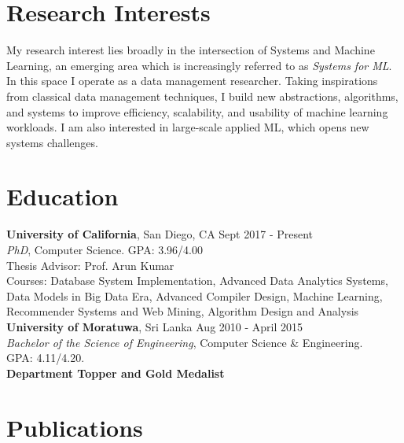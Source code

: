 \documentclass[margin]{res}
\begin{document}

\address{Phone: (+1) 812-558-6888\\ Email: snakanda@eng.ucsd.edu\\ Web: \href{https://scnakandala.github.io}{scnakandala.github.io}}
\address{3232 EBU3B CSE\\9500 Gilman Drive\\La Jolla, CA 92093}


\begin{resume}
\vspace{-2mm}
\section{Research Interests}
My research interest lies broadly in the intersection of Systems and Machine Learning, an emerging area which is increasingly referred to as \textit{Systems for ML}. In this space I operate as a data management researcher.
Taking inspirations from classical data management techniques, I build new abstractions, algorithms, and systems to improve efficiency, scalability, and usability of machine learning workloads. I am also interested in large-scale applied ML, which opens new systems challenges.


\section{Education}
\textbf{University of California}, San Diego, CA \hfill Sept 2017 - Present
\\ 
{\sl PhD}, Computer Science. GPA: 3.96/4.00 
\\
Thesis Advisor: Prof. Arun Kumar\\
Courses: Database System Implementation, Advanced Data Analytics Systems, Data Models in Big Data Era, Advanced Compiler Design, Machine Learning, Recommender Systems and Web Mining, Algorithm Design and Analysis
\vspace{4mm}
\\
\textbf{University of Moratuwa}, Sri Lanka \hfill Aug 2010 - April 2015
\\
{\sl Bachelor of the Science of Engineering}, Computer Science \& Engineering. \\ GPA: 4.11/4.20.
\\ \textbf{Department Topper and Gold Medalist}



\section{Publications}


\end{resume}
\end{document}
